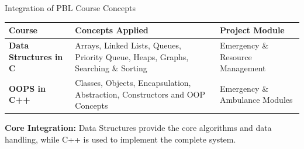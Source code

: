 \documentclass[aspectratio=169,11pt]{beamer}
\begin{document}
\begin{frame}{Integration of PBL Course Concepts}

\scriptsize

\begin{center}

\renewcommand{\arraystretch}{1.45}

\begin{tabularx}{.96\textwidth}
{@{}>{\bfseries}p{3.2cm}X p{3.0cm}@{}}

\toprule

Course & Concepts Applied & Project Module\\

\midrule

Data Structures in C
&
Arrays, Linked Lists, Queues, Priority Queue,
Heaps, Graphs, Searching \& Sorting
&
Emergency \& Resource Management
\\

OOPS in C++
&
Classes, Objects, Encapsulation,
Abstraction, Constructors and OOP Concepts
&
Emergency \& Ambulance Modules
\\

\bottomrule

\end{tabularx}

\end{center}

\vfill

\begin{center}

\colorbox{GEULightBlue}{
\parbox{.86\textwidth}{
\centering
\textbf{Core Integration:}
Data Structures provide the core algorithms and data handling,
while C++ is used to implement the complete system.
}}

\end{center}

\end{frame}
\end{document}

